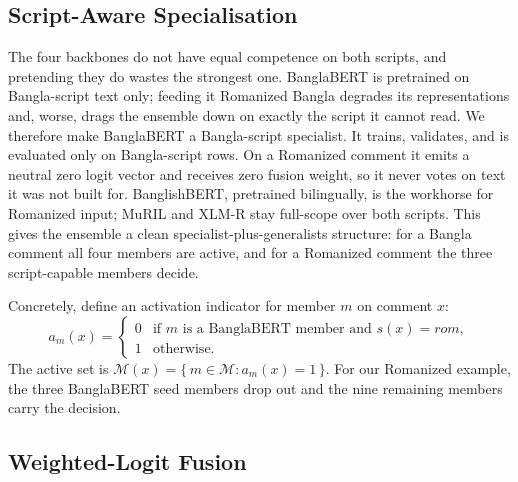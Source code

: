 \documentclass[11pt,a4paper]{article}
\def\textsc#1{#1}%
\begin{document}
\subsection{Script-Aware Specialisation}
\label{sec:scriptaware}

The four backbones do not have equal competence on both scripts, and pretending they do wastes the strongest one. BanglaBERT is pretrained on Bangla-script text only; feeding it Romanized Bangla degrades its representations and, worse, drags the ensemble down on exactly the script it cannot read. We therefore make BanglaBERT a Bangla-script specialist. It trains, validates, and is evaluated only on Bangla-script rows. On a Romanized comment it emits a neutral zero logit vector and receives zero fusion weight, so it never votes on text it was not built for. BanglishBERT, pretrained bilingually, is the workhorse for Romanized input; MuRIL and XLM-R stay full-scope over both scripts. This gives the ensemble a clean specialist-plus-generalists structure: for a Bangla comment all four members are active, and for a Romanized comment the three script-capable members decide.

Concretely, define an activation indicator for member $m$ on comment $x$:
\begin{equation}
a_m(x) =
\begin{cases}
0 & \text{if } m \text{ is a BanglaBERT member and } s(x) = \textsc{rom},\\
1 & \text{otherwise.}
\end{cases}
\label{eq:activation}
\end{equation}
The active set is $\mathcal{M}(x) = \{\, m \in \mathcal{M} : a_m(x) = 1 \,\}$. For our Romanized example, the three BanglaBERT seed members drop out and the nine remaining members carry the decision.

\subsection{Weighted-Logit Fusion}
\label{sec:fusion}
\end{document}
